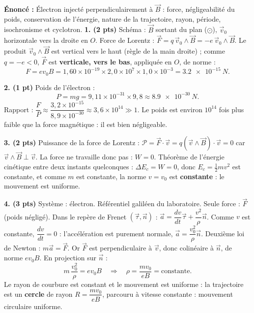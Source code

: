 \documentclass[11pt]{article}
\newcommand{\cle}[1]{{\popxbold\color{popdark}#1}}
\begin{document}
\begin{corrige}
\textbf{Énoncé :} Électron injecté perpendiculairement à $\vec{B}$ : force, négligeabilité du poids, conservation de l'énergie, nature de la trajectoire, rayon, période, isochronisme et cyclotron.
\tcblower
\textbf{1. (2 pts)} Schéma : $\vec{B}$ sortant du plan ($\odot$), $\vec{v}_0$ horizontale vers la droite en $O$.
Force de Lorentz : $\vec{F} = q\,\vec{v}_0\wedge\vec{B} = -e\,\vec{v}_0\wedge\vec{B}$.
Le produit $\vec{v}_0\wedge\vec{B}$ est vertical vers le haut (règle de la main droite) ; comme $q = -e < 0$, $\vec{F}$ est \textbf{verticale, vers le bas}, appliquée en $O$, de norme :
\[ F = e v_0 B = 1{,}60\times 10^{-19}\times 2{,}0\times 10^{7}\times 1{,}0\times 10^{-3} = \SI{3,2e-15}{N}. \]

\textbf{2. (1 pt)} Poids de l'électron :
\[ P = mg = 9{,}11\times 10^{-31}\times 9{,}8 \approx \SI{8,9e-30}{N}. \]
Rapport : $\dfrac{F}{P} \approx \dfrac{3{,}2\times 10^{-15}}{8{,}9\times 10^{-30}} \approx 3{,}6\times 10^{14} \gg 1$. Le poids est environ $10^{14}$ fois plus faible que la force magnétique : il est bien négligeable.

\textbf{3. (2 pts)} Puissance de la force de Lorentz : $\mathcal{P} = \vec{F}\cdot\vec{v} = q(\vec{v}\wedge\vec{B})\cdot\vec{v} = 0$ car $\vec{v}\wedge\vec{B} \perp \vec{v}$. La force ne travaille donc pas : $W = 0$.
Théorème de l'énergie cinétique entre deux instants quelconques : $\Delta E_c = W = 0$, donc $E_c = \tfrac{1}{2}mv^2$ est constante, et comme $m$ est constante, la norme $v = v_0$ est \textbf{constante} : le mouvement est uniforme.

\textbf{4. (3 pts)} Système : électron. Référentiel galiléen du laboratoire. Seule force : $\vec{F}$ (poids négligé).
Dans le repère de Frenet $(\vec{\tau}, \vec{n})$ : $\vec{a} = \dfrac{dv}{dt}\vec{\tau} + \dfrac{v^2}{\rho}\vec{n}$.
Comme $v$ est constante, $\dfrac{dv}{dt} = 0$ : l'accélération est purement normale, $\vec{a} = \dfrac{v_0^2}{\rho}\vec{n}$.
Deuxième loi de Newton : $m\vec{a} = \vec{F}$. Or $\vec{F}$ est perpendiculaire à $\vec{v}$, donc colinéaire à $\vec{n}$, de norme $ev_0B$. En projection sur $\vec{n}$ :
\[ m\,\frac{v_0^2}{\rho} = e v_0 B \quad\Rightarrow\quad \rho = \frac{m v_0}{e B} = \text{constante}. \]
Le rayon de courbure est constant et le mouvement est uniforme : la trajectoire est un \textbf{cercle} de rayon $R = \dfrac{mv_0}{eB}$, parcouru à vitesse constante : mouvement \cle{circulaire uniforme}.


\end{corrige}
\end{document}

